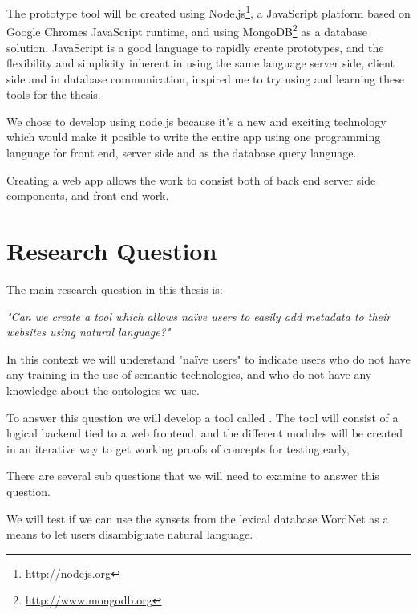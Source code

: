 The prototype tool will be created using Node.js\footnote{\url{http://nodejs.org}},
a JavaScript platform based on Google Chromes JavaScript runtime,
and using MongoDB\footnote{\url{http://www.mongodb.org}} as a database solution.
JavaScript is a good language to rapidly create prototypes, and the flexibility and simplicity inherent in using the same language
server side, client side and in database communication, inspired me to try using and learning these tools for the thesis.

%

We chose to develop using node.js because it's a new and exciting technology which would make it posible to write
the entire app using one programming language for front end, server side and as the database query language.

Creating a web app allows the work to consist both of back end server side components, and front end work.


\section{Research Question}
The main research question in this thesis is:

\emph{"Can we create a tool which allows naïve users to easily add metadata to their websites using natural language?"}

In this context we will understand "naïve users" to indicate users who do not have any training in the use of semantic technologies,
and who do not have any knowledge about the ontologies we use.

To answer this question we will develop a tool called \theartefact.
The tool will consist of a logical backend tied to a web frontend,
and the different modules will be created in an iterative way to get working proofs of concepts for testing early,

There are several sub questions that we will need to examine to answer this question.

We will test if we can use the synsets from the lexical database WordNet as a means to let users disambiguate natural language.

